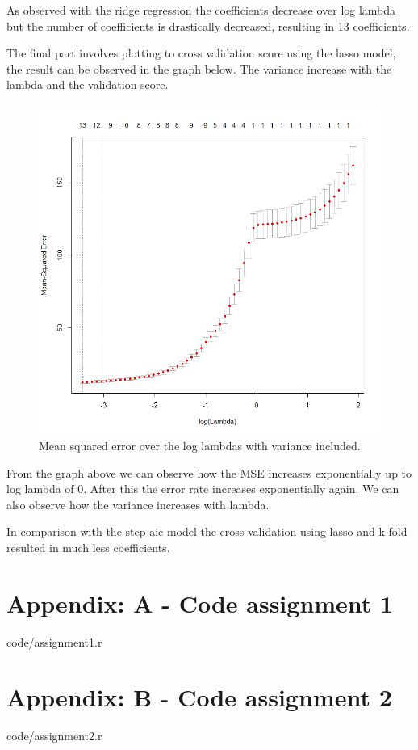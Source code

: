 \documentclass[a4paper,12pt]{article}
\begin{document}
As observed with the ridge regression the coefficients decrease over log lambda but the number of coefficients is drastically decreased, resulting in 13 coefficients.

The final part involves plotting to cross validation score using the lasso model, the result can be observed in the graph below. The variance increase with the lambda and the validation score.
\begin{figure}[H]
\centering
\begin{minipage}[]{0.75\textwidth}
  \includegraphics[width=\textwidth]{figures/Lab2A2_mse_cv_ll.png}  
  \caption{Mean squared error over the log lambdas with variance included.}
 \end{minipage}
\end{figure}
From the graph above we can observe how the MSE increases exponentially up to log lambda of 0. After this the error rate increases exponentially again. We can also observe how the variance increases with lambda.

In comparison with the step aic model the cross validation using lasso and k-fold resulted in much less coefficients. 

\section{Appendix: A - Code assignment 1}


    {code/assignment1.r}

\section{Appendix: B - Code assignment 2}


    {code/assignment2.r}
\end{document}
